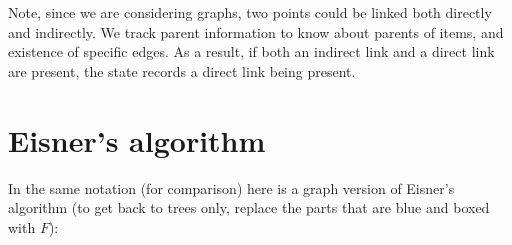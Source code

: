 Note, since we are considering graphs, two points could be linked both directly and indirectly.
We track parent information to know about parents of items, and existence of specific edges.
As a result, if both an indirect link and a direct link are present, the state records a direct link being present.

\section{Eisner's algorithm}

In the same notation (for comparison) here is a graph version of Eisner's algorithm (to get back to trees only, replace the parts that are blue and boxed with $F$):


